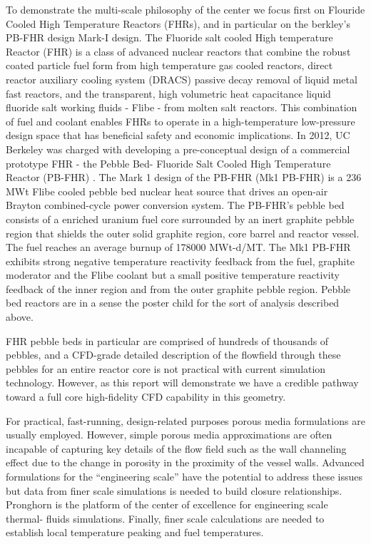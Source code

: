 To demonstrate the multi-scale philosophy of the center we focus first on Flouride Cooled High Temperature Reactors (FHRs), and in particular on the berkley's PB-FHR design Mark-I design. The Fluoride salt cooled High temperature Reactor (FHR) is a class of advanced nuclear reactors that combine the robust coated particle fuel form from high temperature gas cooled reactors, direct reactor auxiliary cooling system (DRACS) passive decay removal of liquid metal fast reactors, and the transparent, high volumetric heat capacitance liquid fluoride salt working fluids - Flibe - from molten salt reactors. This combination of fuel and coolant enables FHRs to operate in a high-temperature low-pressure design space that has beneficial safety and economic implications. In 2012, UC Berkeley was charged with developing a pre-conceptual design of a commercial prototype FHR - the Pebble Bed- Fluoride Salt Cooled High Temperature Reactor (PB-FHR) \cite{cisneros2014technical}. The Mark 1 design of the PB-FHR (Mk1 PB-FHR) is a 236 MWt Flibe cooled pebble bed nuclear heat source that drives an open-air Brayton combined-cycle power conversion system. The PB-FHR's pebble bed consists of a enriched uranium fuel core surrounded by an inert graphite pebble region that shields the outer solid graphite region, core barrel and reactor vessel. The fuel reaches an average burnup of 178000 MWt-d/MT. The Mk1 PB-FHR exhibits strong negative temperature reactivity feedback from the fuel, graphite moderator and the Flibe coolant but a small positive temperature reactivity feedback of the inner region and from the outer graphite pebble region. Pebble bed reactors are in a sense the poster child for the sort of analysis described above.

FHR pebble beds in particular are comprised of hundreds of thousands of pebbles, and a CFD-grade detailed description of the flowfield through these pebbles for an entire reactor core is not practical with current simulation technology. However, as this report will demonstrate we have a credible pathway toward a full core high-fidelity CFD capability in this geometry.

For practical, fast-running, design-related purposes porous media formulations are usually employed. However, simple porous media approximations are often incapable of capturing key details of the flow field such as the wall channeling effect due to the change in porosity in the proximity of the vessel walls.  Advanced formulations for the ``engineering scale'' have the potential to address these issues but data from finer scale simulations is needed to build closure relationships. Pronghorn is the platform of the center of excellence for engineering scale thermal- fluids simulations. Finally, finer scale calculations are needed to establish local temperature peaking and fuel temperatures.

